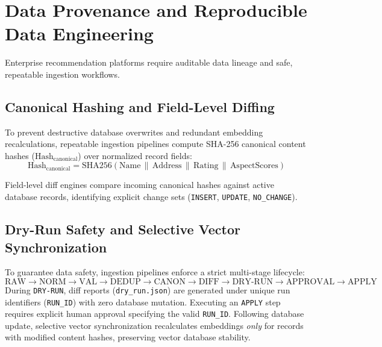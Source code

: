 \section{Data Provenance and Reproducible Data Engineering}
Enterprise recommendation platforms require auditable data lineage and safe, repeatable ingestion workflows.

\subsection{Canonical Hashing and Field-Level Diffing}
To prevent destructive database overwrites and redundant embedding recalculations, repeatable ingestion pipelines compute SHA-256 canonical content hashes ($\text{Hash}_{\text{canonical}}$) over normalized record fields:
\begin{equation}
\text{Hash}_{\text{canonical}} = \text{SHA256}(\text{Name} \,\|\, \text{Address} \,\|\, \text{Rating} \,\|\, \text{AspectScores})
\end{equation}

Field-level diff engines compare incoming canonical hashes against active database records, identifying explicit change sets (\texttt{INSERT}, \texttt{UPDATE}, \texttt{NO\_CHANGE}).

\subsection{Dry-Run Safety and Selective Vector Synchronization}
To guarantee data safety, ingestion pipelines enforce a strict multi-stage lifecycle:
\begin{equation}
\text{RAW} \rightarrow \text{NORM} \rightarrow \text{VAL} \rightarrow \text{DEDUP} \rightarrow \text{CANON} \rightarrow \text{DIFF} \rightarrow \text{DRY-RUN} \rightarrow \text{APPROVAL} \rightarrow \text{APPLY}
\end{equation}
During \texttt{DRY-RUN}, diff reports (\texttt{dry\_run.json}) are generated under unique run identifiers (\texttt{RUN\_ID}) with zero database mutation. Executing an \texttt{APPLY} step requires explicit human approval specifying the valid \texttt{RUN\_ID}. Following database update, selective vector synchronization recalculates embeddings \textit{only} for records with modified content hashes, preserving vector database stability.

